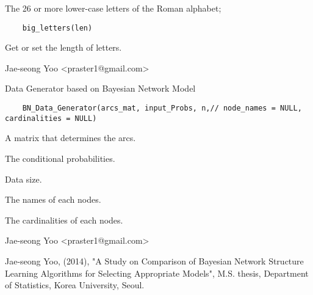 \documentclass[a4paper]{book}
\begin{document}
%
\begin{Description}\relax
The 26 or more lower-case letters of the Roman alphabet;
\end{Description}
%
\begin{Usage}
\begin{verbatim}
	big_letters(len)
\end{verbatim}
\end{Usage}
%
\begin{Arguments}
\begin{ldescription}
\item[\code{len}]  Get or set the length of letters. 
\end{ldescription}
\end{Arguments}
%
\begin{Author}\relax
 Jae-seong Yoo <praster1@gmail.com> 
\end{Author}
%
\begin{Description}\relax
Data Generator based on Bayesian Network Model
\end{Description}
%
\begin{Usage}
\begin{verbatim}
	BN_Data_Generator(arcs_mat, input_Probs, n,// node_names = NULL, cardinalities = NULL)
\end{verbatim}
\end{Usage}
%
\begin{Arguments}
\begin{ldescription}
\item[\code{arcs\_mat}]  A matrix that determines the arcs.
\item[\code{input\_Probs}]  The conditional probabilities. 
\item[\code{n}]  Data size. 
\item[\code{node\_names}]  The names of each nodes. 
\item[\code{cardinalities}]  The cardinalities of each nodes. 
\end{ldescription}
\end{Arguments}
%
\begin{Author}\relax
 Jae-seong Yoo <praster1@gmail.com> 
\end{Author}
%
\begin{References}\relax
Jae-seong Yoo, (2014), "A Study on Comparison of Bayesian Network Structure Learning Algorithms for Selecting Appropriate Models", M.S. thesis, Department of Statistics, Korea University, Seoul.
\end{References}
\end{document}
